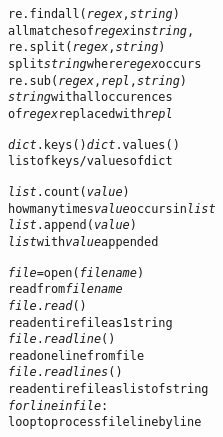 \documentclass[twocolumn,12pt]{article}
\begin{document}
\begin{alltt}
re.findall(\emph{regex}, \emph{string})
    all matches of \emph{regex} in \emph{string},
re.split(\emph{regex}, \emph{string})
    split \emph{string} where \emph{regex} occurs
re.sub(\emph{regex}, \emph{repl}, \emph{string})
    \emph{string} with all occurences
    of \emph{regex}  replaced with \emph{repl}

\emph{dict}.keys() \emph{dict}.values()
    list of keys/values of dict
    
\emph{list}.count(\emph{value})
    how many times \emph{value} occurs in \emph{list}
\emph{list}.append(\emph{value})
    \emph{list} with \emph{value} appended
    
\emph{file} = open(\emph{filename})
    read from \emph{filename}
\emph{file}.\emph{read}()
    read entire file as 1 string 
\emph{file}.\emph{readline}()
    read one line from file
\emph{file}.\emph{readlines}()
    read entire file as list of string 
\emph{for line in file}:
    loop to process file line by line
\end{alltt}
\end{document}
